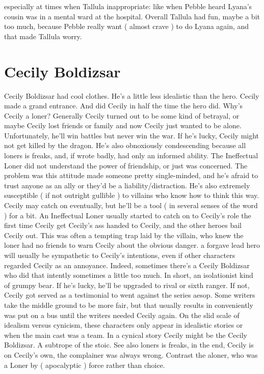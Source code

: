 \documentclass[12pt]{book}
\begin{document}
especially at times when Tallula inappropriate: like when Pebble heard Lyana's cousin was in a mental ward at the hospital. Overall Tallula had fun, maybe a bit too much, because Pebble really want ( almost crave ) to do Lyana again, and that made Tallula worry.



\chapter{Cecily Boldizsar}

Cecily Boldizsar had cool clothes. He's a little less idealistic than the hero. Cecily made a grand entrance. And did Cecily in half the time the hero did. Why's Cecily a loner? Generally Cecily turned out to be some kind of betrayal, or maybe Cecily lost friends or family and now Cecily just wanted to be alone. Unfortunately, he'll win battles but never win the war. If he's lucky, Cecily might not get killed by the dragon. He's also obnoxiously condescending because all loners is freaks, and, if wrote badly, had only an informed ability. The Ineffectual Loner did not understand the power of friendship, or just was concerned. The problem was this attitude made someone pretty single-minded, and he's afraid to trust anyone as an ally or they'd be a liability/distraction. He's also extremely susceptible ( if not outright gullible ) to villains who know how to think this way. Cecily may catch on eventually, but he'll be a tool ( in several senses of the word ) for a bit. An Ineffectual Loner usually started to catch on to Cecily's role the first time Cecily get Cecily's ass handed to Cecily, and the other heroes bail Cecily out. This was often a tempting trap laid by the villain, who knew the loner had no friends to warn Cecily about the obvious danger. a forgave lead hero will usually be sympathetic to Cecily's intentions, even if other characters regarded Cecily as an annoyance. Indeed, sometimes there's a Cecily Boldizsar who did that intently  sometimes a little too much. In short, an isolationist kind of grumpy bear. If he's lucky, he'll be upgraded to rival or sixth ranger. If not, Cecily got served as a testimonial to went against the series aesop. Some writers take the middle ground to be more fair, but that usually results in conveniently was put on a bus until the writers needed Cecily again. On the slid scale of idealism versus cynicism, these characters only appear in idealistic stories or when the main cast was a team. In a cynical story Cecily might be the Cecily Boldizsar. A subtrope of the stoic. See also loners is freaks, in the end, Cecily is on Cecily's own, the complainer was always wrong. Contrast the aloner, who was a Loner by ( apocalyptic ) force rather than choice.
\end{document}
